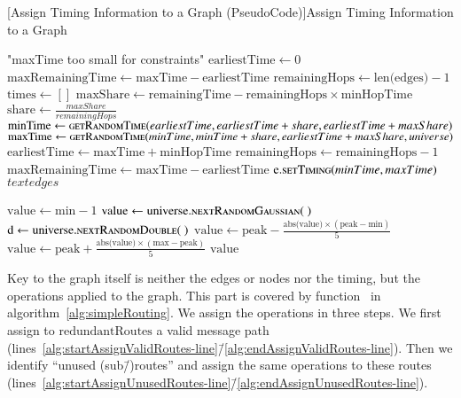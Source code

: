 \begin{breakablealgorithm}
	[Assign Timing Information to a Graph (PseudoCode)]{Assign Timing Information to a Graph}\label{alg:simpleTiming}
	\begin{algorithmic}[1]
		\label{alg:assignTiming-line}
		\Throw "maxTime too small for constraints"
		\EndIf
		\State $\text{earliestTime} \gets 0$
		\State $\text{maxRemainingTime} \gets \text{maxTime}-\text{earliestTime}$
		\State $\text{remainingHops} \gets \text{len(edges)} - 1$
		\State $\text{times} \gets []$
		\State $\text{maxShare} \gets \text{remainingTime} - \text{remainingHops}\times\text{minHopTime}$
		\State $\text{share} \gets \frac{maxShare}{remainingHops}$
		\State $\text{minTime} \gets \Call{getRandomTime}{earliestTime, earliestTime+share, earliestTime+maxShare}$\label{alg:minTime-line}
		\State $\text{maxTime} \gets \Call{getRandomTime}{minTime, minTime+share, earliestTime+maxShare, universe}$\label{alg:maxTime-line}
		\State $\text{earliestTime} \gets \text{maxTime}+\text{minHopTime}$
		\State $\text{remainingHops} \gets \text{remainingHops} - 1$
		\State $\text{maxRemainingTime} \gets \text{maxTime}-\text{earliestTime}$
		\State $\text{e}.\Call{setTiming}{minTime, maxTime}$
		\EndFor
		\Return $text{edges}$
		\EndFunction
		\item[]		
		\label{alg:getRandomTime-line}
		\State $\text{value} \gets \text{min}-1$
		\State $\text{value} \gets \text{universe}.\Call{nextRandomGaussian}{~}$
		\State $\text{d} \gets \text{universe}.\Call{nextRandomDouble}{~}$
		\State $\text{value} \gets \text{peak} - \frac{\text{abs(value)} \times (\text{peak} - \text{min})}{5}$
		\Else
		\State $\text{value} \gets \text{peak} + \frac{\text{abs(value)} \times (\text{max} - \text{peak})}{5}$
		\EndIf
		\EndWhile
		\Return $\text{value}$
		\EndFunction
	\end{algorithmic}
\end{breakablealgorithm}

Key to the graph itself is neither the edges or nodes nor the timing, but the operations applied to the graph. This part is covered by function~ in algorithm~\ref{alg:simpleRouting}. We assign the operations in three steps. We first assign to $\text{redundantRoutes}$ a valid message path (lines~\ref{alg:startAssignValidRoutes-line}\=/\ref{alg:endAssignValidRoutes-line}). Then we identify ``unused (sub\=/)routes'' and assign the same operations to these routes (lines~\ref{alg:startAssignUnusedRoutes-line}\=/\ref{alg:endAssignUnusedRoutes-line}). 

